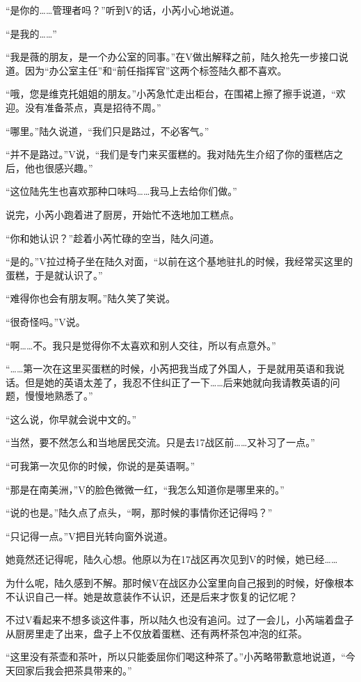 “是你的……管理者吗？”听到V的话，小芮小心地说道。

“是我的……”

“我是薇的朋友，是一个办公室的同事。”在V做出解释之前，陆久抢先一步接口说道。因为“办公室主任”和“前任指挥官”这两个标签陆久都不喜欢。

“哦，您是维克托姐姐的朋友。”小芮急忙走出柜台，在围裙上擦了擦手说道，“欢迎。没有准备茶点，真是招待不周。”

“哪里。”陆久说道，“我们只是路过，不必客气。”

“并不是路过。”V说，“我们是专门来买蛋糕的。我对陆先生介绍了你的蛋糕店之后，他也很感兴趣。”

“这位陆先生也喜欢那种口味吗……我马上去给你们做。”

说完，小芮小跑着进了厨房，开始忙不迭地加工糕点。

“你和她认识？”趁着小芮忙碌的空当，陆久问道。

“是的。”V拉过椅子坐在陆久对面，“以前在这个基地驻扎的时候，我经常买这里的蛋糕，于是就认识了。”

“难得你也会有朋友啊。”陆久笑了笑说。

“很奇怪吗。”V说。

“啊……不。我只是觉得你不太喜欢和别人交往，所以有点意外。”

“……第一次在这里买蛋糕的时候，小芮把我当成了外国人，于是就用英语和我说话。但是她的英语太差了，我忍不住纠正了一下……后来她就向我请教英语的问题，慢慢地熟悉了。”

“这么说，你早就会说中文的。”

“当然，要不然怎么和当地居民交流。只是去17战区前……又补习了一点。”

“可我第一次见你的时候，你说的是英语啊。”

“那是在南美洲，”V的脸色微微一红，“我怎么知道你是哪里来的。”

“说的也是。”陆久点了点头，“啊，那时候的事情你还记得吗？”

“只记得一点。”V把目光转向窗外说道。

她竟然还记得呢，陆久心想。他原以为在17战区再次见到V的时候，她已经……

为什么呢，陆久感到不解。那时候V在战区办公室里向自己报到的时候，好像根本不认识自己一样。她是故意装作不认识，还是后来才恢复的记忆呢？

不过V看起来不想多谈这件事，所以陆久也没有追问。过了一会儿，小芮端着盘子从厨房里走了出来，盘子上不仅放着蛋糕、还有两杯茶包冲泡的红茶。

“这里没有茶壶和茶叶，所以只能委屈你们喝这种茶了。”小芮略带歉意地说道，“今天回家后我会把茶具带来的。”

